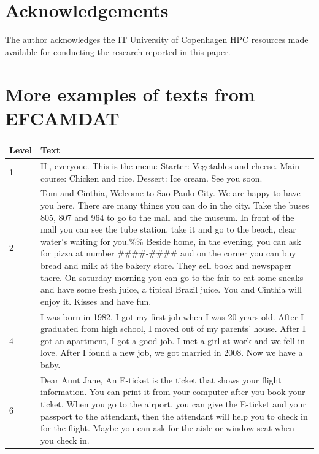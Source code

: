 \documentclass[11pt,a4paper]{article}
\begin{document}
\section{Acknowledgements}

The author acknowledges the IT University of Copenhagen HPC resources made available for conducting the research reported in this paper.

\printbibliography

\appendix

\section{More examples of texts from EFCAMDAT}

\begin{longtable}{l|p{}}
  \toprule
  Level & Text\\
  \midrule
  1 & Hi, everyone. This is the menu: Starter: Vegetables and cheese. Main
  course: Chicken and rice. Dessert: Ice cream. See you soon.\\
  \midrule
  2 & Tom and Cinthia, Welcome to Sao Paulo City. We are happy to have you
  here. There are many things you can do in the city. Take the buses 805, 807
  and 964 to go to the mall and the museum. In front of the mall you can see
  the tube station, take it and go to the beach, clear water's waiting for
  you.\%\% Beside home, in the evening, you can ask for pizza at number
  \#\#\#\#-\#\#\#\# and on the corner you can buy bread and milk at the bakery store. They sell
  book and newspaper there. On saturday morning you can go to the fair to eat
  some sneaks and have some fresh juice, a tipical Brazil juice. You and
  Cinthia will enjoy it. Kisses and have fun. \\
  \midrule
  4 & I was born in 1982. I got my first job when I was 20 years old. After I
  graduated from high school, I moved out of my parents' house. After I got an
  apartment, I got a good job. I met a girl at work and we fell in love. After
  I found a new job, we got married in 2008. Now we have a baby.\\
  \midrule
  6 & Dear Aunt Jane, An E-ticket is the ticket that shows your flight
  information. You can print it from your computer after you book your ticket.
  When you go to the airport, you can give the E-ticket and your passport to
  the attendant, then the attendant will help you to check in for the flight.
  Maybe you can ask for the aisle or window seat when you check in.\\

\end{longtable}
\end{document}
